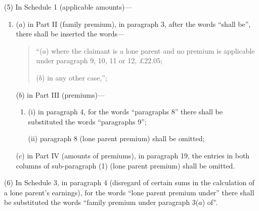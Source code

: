 \documentclass[a4paper]{article}
\begin{document}
(5) In Schedule 1 (applicable amounts)---
\begin{enumerate}\item[]
($a$) in Part II (family premium), in paragraph 3, after the words “shall be”, there shall be inserted the words—
\begin{quotation}
“($a$) where the claimant is a lone parent and no premium is applicable under paragraph 9, 10, 11 or 12, £22.05;

($b$) in any other case,”;
\end{quotation}

($b$) in Part III (premiums)—
\begin{enumerate}\item[]
(i) in paragraph 4, for the words “paragraphs 8” there shall be substituted the words “paragraphs 9”;

(ii) paragraph 8 (lone parent premium) shall be omitted;
\end{enumerate}

($c$) in Part IV (amounts of premiums), in paragraph 19, the entries in both columns of sub-paragraph (1) (lone parent premium) shall be omitted.
\end{enumerate}

(6) In Schedule 3, in paragraph 4 (disregard of certain sums in the calculation of a lone parent’s earnings), for the words “lone parent premium under” there shall be substituted the words “family premium under paragraph 3($a$) of”.
\end{document}

